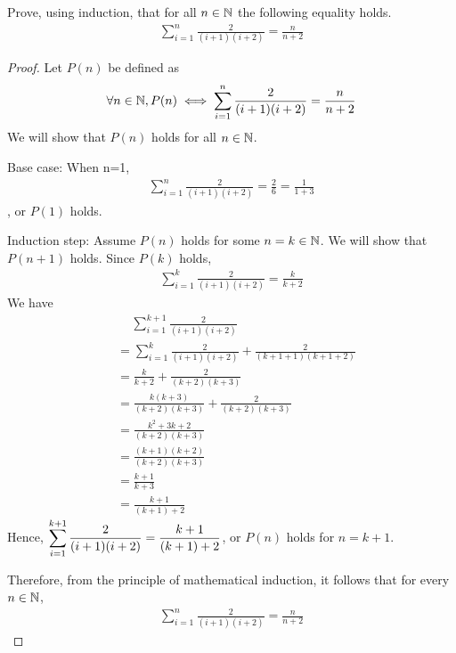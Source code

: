 \begin{question}
    \normalfont
    Prove, using induction, that for all $n\in\mathbb N$ the following equality holds.
    \[
        \begin{aligned}
            \sum_{i=1}^{n}\frac{2}{(i+1)(i+2)}=\frac{n}{n+2}
        \end{aligned}
    \]
\end{question}

\begin{proof}
    \renewcommand{\qedsymbol}{$\blacksquare$}
    Let $P(n)$ be defined as 
    \[
        \begin{aligned}
            \forall n\in\mathbb N, P(n)\iff \sum_{i=1}^{n}\frac{2}{(i+1)(i+2)}=\frac{n}{n+2}
        \end{aligned}
    \]
    We will show that $P(n)$ holds for all $n\in\mathbb N$.

    Base case: When n=1, 
    \[
        \begin{aligned}
            \sum_{i=1}^{n}\frac{2}{(i+1)(i+2)}=\frac{2}{6}=\frac{1}{1+3}
        \end{aligned}
    \]
    , or $P(1)$ holds.

    Induction step: Assume $P(n)$ holds for some $n=k\in\mathbb N$. We will show that $P(n+1)$ holds.
    Since $P(k)$ holds, 
    \[
        \begin{aligned}
            \sum_{i=1}^{k}\frac{2}{(i+1)(i+2)}=\frac{k}{k+2}
        \end{aligned}
    \]
    We have 
    \[
        \begin{aligned}
            &\quad\, \sum_{i=1}^{k+1}\frac{2}{(i+1)(i+2)}\\
            &= \sum_{i=1}^{k}\frac{2}{(i+1)(i+2)}+\frac{2}{(k+1+1)(k+1+2)}\\
            &= \frac{k}{k+2}+\frac{2}{(k+2)(k+3)}\\
            &= \frac{k(k+3)}{(k+2)(k+3)}+\frac{2}{(k+2)(k+3)}\\
            &= \frac{k^2+3k+2}{(k+2)(k+3)}\\
            &= \frac{(k+1)(k+2)}{(k+2)(k+3)}\\
            &= \frac{k+1}{k+3}\\
            &= \frac{k+1}{(k+1)+2}
        \end{aligned}
    \]
    Hence, $\mathlarger{\sum_{i=1}^{k+1}\frac{2}{(i+1)(i+2)}=\frac{k+1}{(k+1)+2}}$, or $P(n)$ holds for $n=k+1$.
    
    Therefore, from the principle of mathematical induction, it follows that for every $n\in\mathbb N$, 
    \[
        \begin{aligned}
            \sum_{i=1}^{n}\frac{2}{(i+1)(i+2)}=\frac{n}{n+2}
        \end{aligned}
    \]
\end{proof}